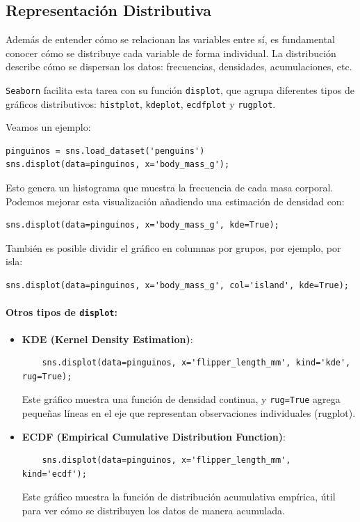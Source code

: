 \documentclass{article}
\theoremstyle{nonumberplain}
\begin{document}
\vspace{1em}
\subsection*{Representación Distributiva}

Además de entender cómo se relacionan las variables entre sí, es fundamental conocer cómo se distribuye cada variable de forma individual. La distribución describe cómo se dispersan los datos: frecuencias, densidades, acumulaciones, etc.

\texttt{Seaborn} facilita esta tarea con su función \texttt{displot}, que agrupa diferentes tipos de gráficos distributivos: \texttt{histplot}, \texttt{kdeplot}, \texttt{ecdfplot} y \texttt{rugplot}.

Veamos un ejemplo:

\begin{verbatim}
pinguinos = sns.load_dataset('penguins')
sns.displot(data=pinguinos, x='body_mass_g');
\end{verbatim}

Esto genera un histograma que muestra la frecuencia de cada masa corporal. Podemos mejorar esta visualización añadiendo una estimación de densidad con:

\begin{verbatim}
sns.displot(data=pinguinos, x='body_mass_g', kde=True);
\end{verbatim}

También es posible dividir el gráfico en columnas por grupos, por ejemplo, por isla:

\begin{verbatim}
sns.displot(data=pinguinos, x='body_mass_g', col='island', kde=True);
\end{verbatim}

\paragraph{Otros tipos de \texttt{displot}:}

\begin{itemize}
    \item \textbf{KDE (Kernel Density Estimation)}:
    \begin{verbatim}
    sns.displot(data=pinguinos, x='flipper_length_mm', kind='kde', rug=True);
    \end{verbatim}
    Este gráfico muestra una función de densidad continua, y \texttt{rug=True} agrega pequeñas líneas en el eje que representan observaciones individuales (rugplot).

    \item \textbf{ECDF (Empirical Cumulative Distribution Function)}:
    \begin{verbatim}
    sns.displot(data=pinguinos, x='flipper_length_mm', kind='ecdf');
    \end{verbatim}
    Este gráfico muestra la función de distribución acumulativa empírica, útil para ver cómo se distribuyen los datos de manera acumulada.
\end{itemize}
\end{document}
